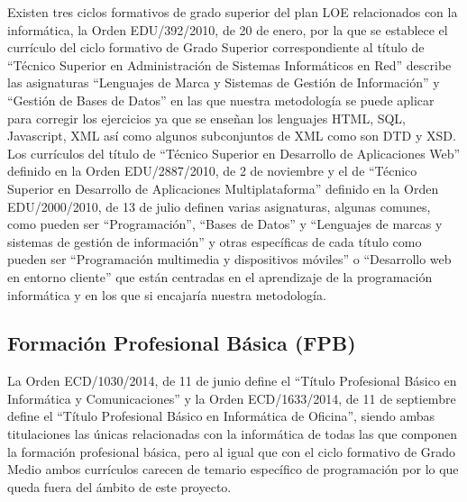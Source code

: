 Existen tres ciclos formativos de grado superior del plan LOE relacionados con la informática, la Orden EDU/392/2010, de 20 de enero, por la que se establece el currículo del ciclo formativo de Grado Superior correspondiente al título de ``Técnico Superior en Administración de Sistemas Informáticos en Red'' describe las asignaturas ``Lenguajes de Marca y Sistemas de Gestión de Información'' y ``Gestión de Bases de Datos'' en las que nuestra metodología se puede aplicar para corregir los ejercicios ya que se enseñan los lenguajes HTML, SQL, Javascript, XML así como algunos subconjuntos de XML como son DTD y XSD. Los currículos del título de ``Técnico Superior en Desarrollo de Aplicaciones Web'' definido en la Orden EDU/2887/2010, de 2 de noviembre y el de ``Técnico Superior en Desarrollo de Aplicaciones Multiplataforma'' definido en la Orden EDU/2000/2010, de 13 de julio definen varias asignaturas, algunas comunes, como pueden ser ``Programación'', ``Bases de Datos'' y ``Lenguajes de marcas y sistemas de gestión de información'' y otras específicas de cada título como pueden ser ``Programación multimedia y dispositivos móviles'' o ``Desarrollo web en entorno cliente'' que están centradas en el aprendizaje de la programación informática y en los que si encajaría nuestra metodología.

\subsection {Formación Profesional Básica (FPB)}

La Orden ECD/1030/2014, de 11 de junio define el ``Título Profesional Básico en Informática y Comunicaciones'' y la Orden ECD/1633/2014, de 11 de septiembre define el  ``Título Profesional Básico en Informática de Oficina'', siendo ambas titulaciones las únicas relacionadas con la informática de todas las que componen la formación profesional básica, pero al igual que con el ciclo formativo de Grado Medio ambos currículos carecen de temario específico de programación por lo que queda fuera del ámbito de este proyecto.




